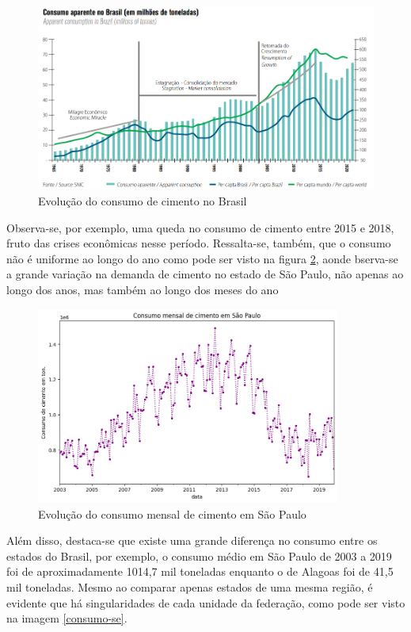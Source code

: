 \begin{figure}[H] 
    \includegraphics[width= 14cm]{../figuras/evolucao-consumo.png}
    \caption{Evolução do consumo de cimento no Brasil \cite{relatorio-snic}}
    \label{fig:evolucao-consumo-cimento}
\end{figure}

Observa-se, por exemplo, uma queda no consumo de cimento entre 2015 e 2018,
fruto das crises econômicas nesse período. Ressalta-se, também,
que o consumo não é uniforme ao longo do ano como pode ser 
visto na figura \ref{consumo-sp}, aonde bserva-se a 
grande variação na demanda de cimento no estado
de São Paulo, não apenas ao longo dos anos, mas também ao 
longo dos meses do ano

\begin{figure}[H]
    \centering
    \includegraphics[width=10cm]{../figuras/graficos/evolucao-consumo-sp.png}
    \caption{Evolução do consumo mensal de cimento em São Paulo}
    \label{consumo-sp}
\end{figure}

Além disso, destaca-se que existe uma 
grande diferença no consumo entre os estados do Brasil, por 
exemplo, o consumo médio em São Paulo de 2003 a 2019 foi de 
aproximadamente 1014,7 mil toneladas enquanto o de 
Alagoas foi de 41,5 mil toneladas. Mesmo ao comparar apenas
estados de uma mesma região, é evidente que há singularidades 
de cada unidade da federação, como pode ser visto na imagem
\ref{consumo-se}.

